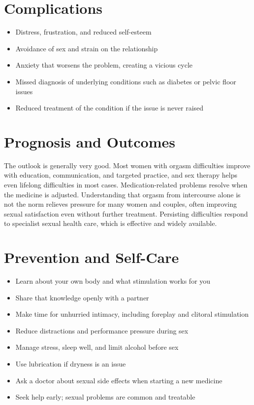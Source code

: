 \section*{Complications}
\begin{itemize}
    \item Distress, frustration, and reduced self-esteem
    \item Avoidance of sex and strain on the relationship
    \item Anxiety that worsens the problem, creating a vicious cycle
    \item Missed diagnosis of underlying conditions such as diabetes or pelvic floor issues
    \item Reduced treatment of the condition if the issue is never raised
\end{itemize}

\section*{Prognosis and Outcomes}
The outlook is generally very good. Most women with orgasm difficulties improve with education, communication, and targeted practice, and sex therapy helps even lifelong difficulties in most cases. Medication-related problems resolve when the medicine is adjusted. Understanding that orgasm from intercourse alone is not the norm relieves pressure for many women and couples, often improving sexual satisfaction even without further treatment. Persisting difficulties respond to specialist sexual health care, which is effective and widely available.

\section*{Prevention and Self-Care}
\begin{itemize}
    \item Learn about your own body and what stimulation works for you
    \item Share that knowledge openly with a partner
    \item Make time for unhurried intimacy, including foreplay and clitoral stimulation
    \item Reduce distractions and performance pressure during sex
    \item Manage stress, sleep well, and limit alcohol before sex
    \item Use lubrication if dryness is an issue
    \item Ask a doctor about sexual side effects when starting a new medicine
    \item Seek help early; sexual problems are common and treatable
\end{itemize}

